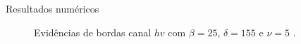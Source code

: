 \documentclass[10pt]{beamer}
\begin{document}
\begin{frame}{Resultados numéricos}
\begin{figure}[hbt]
	\caption{Evidências de bordas canal $hv$ com $\beta = 25$, $\delta = 155$ e $\nu = 5$ .}
\endminipage\hfill
\end{figure}
\end{frame}
\end{document}
